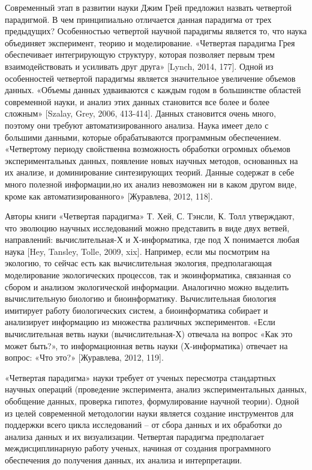 \documentclass[11pt,a4paper]{article}
\begin{document}
Современный этап в развитии науки Джим Грей предложил назвать четвертой
парадигмой. В чем принципиально отличается данная парадигма от трех
предыдущих? Особенностью четвертой научной парадигмы является то, что
наука объединяет эксперимент, теорию и моделирование. «Четвертая
парадигма Грея обеспечивает интегрирующую структуру, которая позволяет
первым трем взаимодействовать и усиливать друг друга» {[}Lynch, 2014,
177{]}. Одной из особенностей четвертой парадигмы является значительное
увеличение объемов данных. «Объемы данных удваиваются с каждым годом в
большинстве областей современной науки, и анализ этих данных становится
все более и более сложным» {[}Szalay, Grey, 2006, 413-414{]}. Данных
становится очень много, поэтому они требуют автоматизированного анализа.
Наука имеет дело с большими данными, которые обрабатываются программным
обеспечением. «Четвертому периоду свойственна возможность обработки
огромных объемов экспериментальных данных, появление новых научных
методов, основанных на их анализе, и доминирование синтезирующих теорий.
Данные содержат в себе много полезной информации,но их анализ невозможен
ни в каком другом виде, кроме как автоматизированного» {[}Журавлева,
2012, 118{]}.

Авторы книги «Четвертая парадигма» Т. Хей, С. Тэнсли, К. Толл
утверждают, что эволюцию научных исследований можно представить в виде
двух ветвей, направлений: вычислительная-Х и Х-информатика, где под Х
понимается любая наука {[}Hey, Tansley, Tolle, 2009, xix{]}. Например,
если мы посмотрим на экологию, то сейчас есть как вычислительная
экология, предполагающая моделирование экологических процессов, так и
экоинформатика, связанная со сбором и анализом экологической информации.
Аналогично можно выделить вычислительную биологию и биоинформатику.
Вычислительная биология имитирует работу биологических систем, а
биоинформатика собирает и анализирует информацию из множества различных
экспериментов. «Если вычислительная ветвь науки (вычислительная-Х)
отвечала на вопрос «Как это может быть?», то информационная ветвь науки
(Х-информатика) отвечает на вопрос: «Что это?» {[}Журавлева, 2012,
119{]}.

«Четвертая парадигма» науки требует от ученых пересмотра стандартных
научных операций (проведение эксперимента, анализ экспериментальных
данных, обобщение данных, проверка гипотез, формулирование научной
теории). Одной из целей современной методологии науки является создание
инструментов для поддержки всего цикла исследований -- от сбора данных и
их обработки до анализа данных и их визуализации. Четвертая парадигма
предполагает междисциплинарную работу ученых, начиная от создания
программного обеспечения до получения данных, их анализа и
интерпретации.
\end{document}
